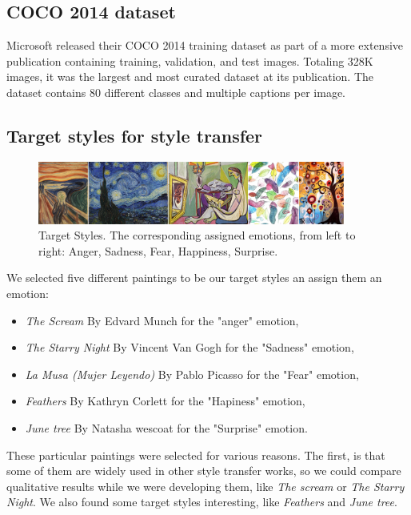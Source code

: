 \subsection{COCO 2014 dataset}

Microsoft released their COCO 2014 training dataset as part of a more extensive publication containing training, validation, and test images. Totaling 328K images, it was the largest and most curated dataset at its publication. The dataset contains 80 different classes and multiple captions per image. 


\subsection{Target styles for style transfer}


\begin{figure}[h]
  \centering
  \includegraphics[width = 0.9\textwidth]{resources/target_styles.png}
  \caption{Target Styles. The corresponding assigned emotions, from left to right: Anger, Sadness, Fear, Happiness, Surprise.}
  \label{fig:target_styles}
\end{figure}

We selected five different paintings to be our target styles an assign them an emotion:
         \begin{itemize}
          \item \emph{The Scream} By Edvard Munch for the "anger" emotion,
          \item \emph{The Starry Night} By Vincent Van Gogh for the "Sadness" emotion,
          \item \emph{La Musa (Mujer Leyendo)} By Pablo Picasso for the "Fear" emotion,
          \item \emph{Feathers} By Kathryn Corlett for the "Hapiness" emotion,
          \item \emph{June tree} By Natasha wescoat for the "Surprise" emotion.

\end{itemize}

These particular paintings were selected for various reasons. The first, is that some of them are widely used in other style transfer works, so we could compare qualitative results while we were developing them, like \emph{The scream} or \emph{The Starry Night}. We also found some target styles interesting, like \emph{Feathers} and \emph{June tree}. 

